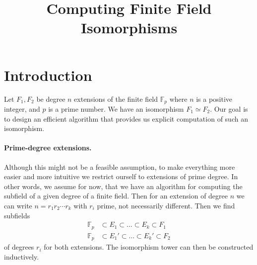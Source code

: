 \documentclass[12pt]{article}
\title{Computing Finite Field Isomorphisms}
\date{}
\theoremstyle{plain}
\theoremstyle{definition}
\def\F{\mathbb{F}}
\newcounter{algorithm}
\begin{document}
\maketitle
\tableofcontents

\section{Introduction}

Let $F_1, F_2$ be degree $n$ extensions of the finite field $\F_p$ where $n$ is a positive integer, and $p$ is a prime number. We
have an isomorphism $F_1 \simeq F_2$. Our goal is to design an efficient algorithm that provides us explicit computation of such
an isomorphism.

\paragraph{Prime-degree extensions.} Although this might not be a feasible assumption, to make everything more easier and more
intuitive we 
restrict ourself to extensions of prime degree. In other words, we assume for now, that we have an algorithm for computing the
subfield of a given degree of a finite field. Then for an extension of degree $n$ we can write $n = r_1r_2\cdots r_k$ with $r_i$
prime, not necessarily different. Then we find subfields 
\begin{align*}
	\F_p & \subset E_1 \subset \ldots \subset E_k \subset F_1 \\
	\F_p & \subset E_1' \subset \ldots \subset E_k' \subset F_2
\end{align*}
of degrees $r_i$ for both extensions. The isomorphism tower can then be constructed inductively. 
\end{document}
